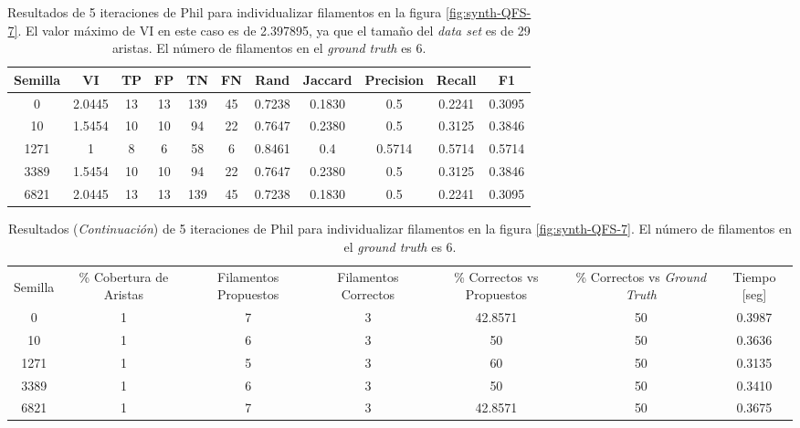 \begin{table}[h]
    \centering
    \begin{tabular}{|c|c|c|c|c|c|c|c|c|c|c|}
    \hline
        Semilla & VI & TP & FP &TN &FN & Rand	& Jaccard &	Precision &	Recall &	F1 \\ \hline 
        0    & 2.0445 & 13 & 13 & 139 & 45 & 0.7238 & 0.1830 & 0.5 & 0.2241 & 0.3095\\
        10   & 1.5454 & 10 & 10 & 94  & 22 & 0.7647 & 0.2380 & 0.5 & 0.3125 & 0.3846\\
        1271 & 1 & 8  & 6  & 58  & 6  & 0.8461 & 0.4 & 0.5714 & 0.5714 & 0.5714\\
        3389 & 1.5454 & 10 & 10 & 94  & 22 & 0.7647 & 0.2380 & 0.5 & 0.3125 & 0.3846\\
        6821 & 2.0445 & 13 & 13 & 139 & 45 & 0.7238 & 0.1830 & 0.5  & 0.2241 & 0.3095\\
        \hline
    \end{tabular}
    \caption{Resultados de 5 iteraciones de Phil para individualizar filamentos en la figura \ref{fig:synth-QFS-7}. El valor m\'aximo de VI en este caso es de 2.397895, ya que el tama\~no del {\it data set} es de 29 aristas. El n\'umero de filamentos en el {\it ground truth} es 6.}
    \label{tab:Synth-QuantitativeIFS-Fig7DetailedResults1}
\end{table}
\addtocounter{table}{-1}
\begin{table}[h]
    \centering
    \begin{tabular}{|c|c|c|c|c|c|c|}
    \hline
         & \multirow{4}{2cm}{\centering \% Cobertura de Aristas} & \multirow{4}{2cm}{Filamentos Propuestos} & \multirow{4}{2cm}{Filamentos Correctos} & \multirow{4}{2.5cm}{\% Correctos vs Propuestos} & \multirow{4}{2.5cm}{\centering \% Correctos vs {\it Ground Truth}} & \multirow{4}{1.2cm}{\centering Tiempo [seg]} \\
         &  &  &  & & &  \\
        Semilla &  &  &  & & &  \\
        &  &  &  & & &  \\ \hline 
        0 & 1 & 7 & 3 & 42.8571 & 50 & 0.3987\\
        10 & 1 & 6 & 3 & 50 & 50 & 0.3636\\
        1271 & 1 & 5 & 3 & 60 & 50 & 0.3135\\
        3389 & 1 & 6 & 3 & 50 & 50 & 0.3410\\
        6821 & 1 & 7 & 3 & 42.8571 & 50 & 0.3675\\
        \hline
    \end{tabular}
    \caption{Resultados ({\it Continuaci\'on}) de 5 iteraciones de Phil para individualizar filamentos en la figura \ref{fig:synth-QFS-7}. El n\'umero de filamentos en el {\it ground truth} es 6.}
\end{table}


